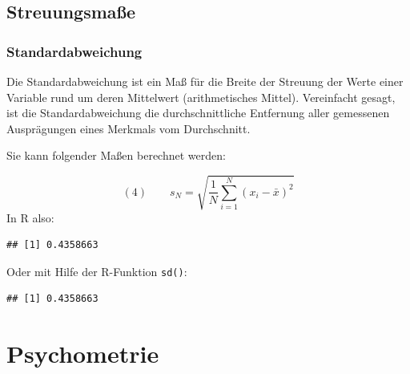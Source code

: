 \documentclass[
  ngerman,
]{book}
\newenvironment{Shaded}{\begin{snugshade}}{\end{snugshade}}
\newcommand{\DecValTok}[1]{\textcolor[rgb]{0.00,0.00,0.81}{#1}}
\newcommand{\FunctionTok}[1]{\textcolor[rgb]{0.13,0.29,0.53}{\textbf{#1}}}
\newcommand{\NormalTok}[1]{#1}
\newcommand{\SpecialCharTok}[1]{\textcolor[rgb]{0.81,0.36,0.00}{\textbf{#1}}}
\begin{document}
\section{Streuungsmaße}\label{streuungsmauxdfe}

\subsection{Standardabweichung}\label{standardabweichung}

Die Standardabweichung ist ein Maß für die Breite der Streuung der Werte einer Variable rund um deren Mittelwert (arithmetisches Mittel). Vereinfacht gesagt, ist die Standardabweichung die durchschnittliche Entfernung aller gemessenen Ausprägungen eines Merkmals vom Durchschnitt.

Sie kann folgender Maßen berechnet werden:

\[
(4)\qquad
s_{N}=\sqrt{\frac{1}{N} \sum_{i=1}^{N}\left(x_{i}-\bar{x}\right)^{2}}
\]
In R also:

\begin{Shaded}
\end{Shaded}

\begin{verbatim}
## [1] 0.4358663
\end{verbatim}

Oder mit Hilfe der R-Funktion \texttt{sd()}:

\begin{Shaded}
\end{Shaded}

\begin{verbatim}
## [1] 0.4358663
\end{verbatim}

\chapter{Psychometrie}\label{psychometrie}
\end{document}

